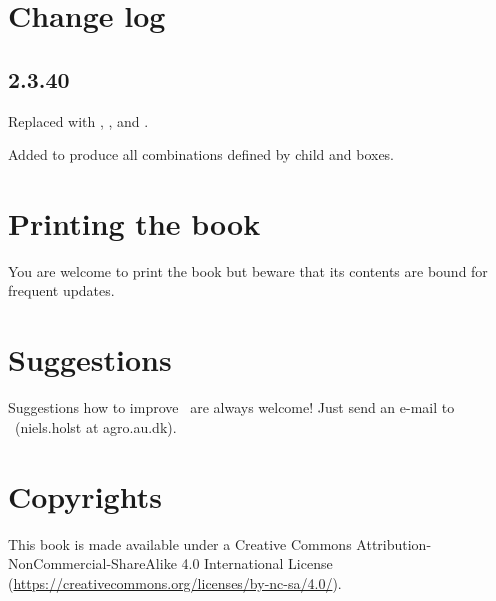 \section{Change log}
\subsection{2.3.40}
Replaced  with , ,  and .

Added  to produce all combinations defined by child  and  boxes.


\section{Printing the book}
You are welcome to print the book but beware that its contents are bound for frequent updates. 

\section{Suggestions}
Suggestions how to improve \US\ are always welcome! Just send an e-mail to  \USS\ (niels.holst at agro.au.dk).


\section{Copyrights}
This book is made available under a Creative Commons Attribution-NonCommercial-ShareAlike 4.0 International License (\url{https://creativecommons.org/licenses/by-nc-sa/4.0/}).
